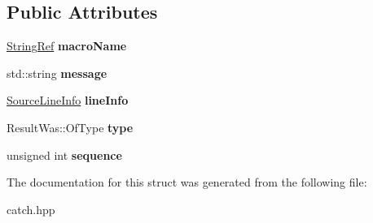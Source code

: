\subsection*{Public Attributes}
\begin{DoxyCompactItemize}
\item 
\hyperlink{classCatch_1_1StringRef}{String\+Ref} {\bfseries macro\+Name}\hypertarget{structCatch_1_1MessageInfo_a3ee7cd41def0989d2193bad7101436a0}{}\label{structCatch_1_1MessageInfo_a3ee7cd41def0989d2193bad7101436a0}

\item 
std\+::string {\bfseries message}\hypertarget{structCatch_1_1MessageInfo_ab6cd06e050bf426c6577502a5c50e256}{}\label{structCatch_1_1MessageInfo_ab6cd06e050bf426c6577502a5c50e256}

\item 
\hyperlink{structCatch_1_1SourceLineInfo}{Source\+Line\+Info} {\bfseries line\+Info}\hypertarget{structCatch_1_1MessageInfo_a985165328723e599696ebd8e43195cc5}{}\label{structCatch_1_1MessageInfo_a985165328723e599696ebd8e43195cc5}

\item 
Result\+Was\+::\+Of\+Type {\bfseries type}\hypertarget{structCatch_1_1MessageInfo_ae928b9117465c696e45951d9d0284e78}{}\label{structCatch_1_1MessageInfo_ae928b9117465c696e45951d9d0284e78}

\item 
unsigned int {\bfseries sequence}\hypertarget{structCatch_1_1MessageInfo_a7f4f57ea21e50160adefce7b68a781d6}{}\label{structCatch_1_1MessageInfo_a7f4f57ea21e50160adefce7b68a781d6}

\end{DoxyCompactItemize}


The documentation for this struct was generated from the following file\+:\begin{DoxyCompactItemize}
\item 
catch.\+hpp\end{DoxyCompactItemize}
